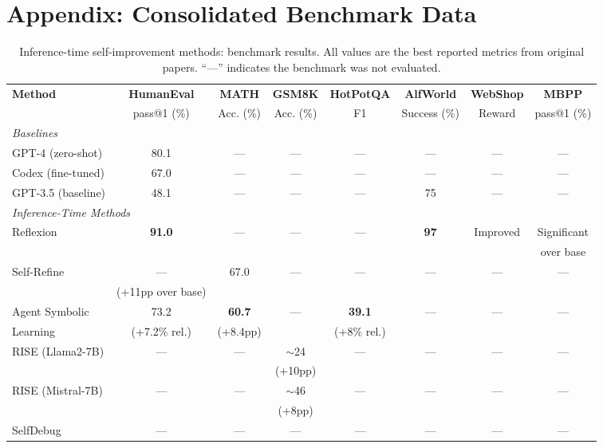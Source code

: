 
\section*{Appendix: Consolidated Benchmark Data}\label{app:benchmark-data}

\begin{table}[t]
\centering
\caption{Inference-time self-improvement methods: benchmark results. All values are the best reported metrics from original papers. ``---'' indicates the benchmark was not evaluated.}
\label{tab:bench-inference}
\begin{tabular}{@{}lccccccc@{}}
\toprule
\textbf{Method} & \textbf{HumanEval} & \textbf{MATH} & \textbf{GSM8K} & \textbf{HotPotQA} & \textbf{AlfWorld} & \textbf{WebShop} & \textbf{MBPP} \\
 & pass@1 (\%) & Acc. (\%) & Acc. (\%) & F1 & Success (\%) & Reward & pass@1 (\%) \\
\midrule
\multicolumn{8}{l}{\textit{Baselines}} \\
GPT-4 (zero-shot) & 80.1 & --- & --- & --- & --- & --- & --- \\
Codex (fine-tuned) & 67.0 & --- & --- & --- & --- & --- & --- \\
GPT-3.5 (baseline) & 48.1 & --- & --- & --- & 75 & --- & --- \\
\midrule
\multicolumn{8}{l}{\textit{Inference-Time Methods}} \\
Reflexion & \textbf{91.0} & --- & --- & --- & \textbf{97} & Improved & Significant \\
 & & & & & & & over base \\
Self-Refine & --- & 67.0 & --- & --- & --- & --- & --- \\
 & (+11pp over base) & & & & & & \\
Agent Symbolic & 73.2 & \textbf{60.7} & --- & \textbf{39.1} & --- & --- & --- \\
Learning & (+7.2\% rel.) & (+8.4pp) & & (+8\% rel.) & & & \\
RISE (Llama2-7B) & --- & --- & $\sim$24 & --- & --- & --- & --- \\
 & & & (+10pp) & & & & \\
RISE (Mistral-7B) & --- & --- & $\sim$46 & --- & --- & --- & --- \\
 & & & (+8pp) & & & & \\
SelfDebug & --- & --- & --- & --- & --- & --- & --- \\
\bottomrule
\end{tabular}
\end{table}

